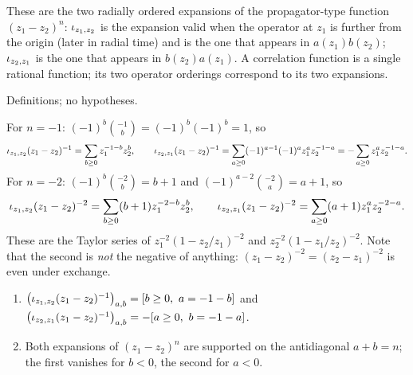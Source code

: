 \begin{physics}
These are the two radially ordered expansions of the propagator-type function $(z_1-z_2)^n$:
$\iota_{z_1,z_2}$ is the expansion valid when the operator at $z_1$ is further from the origin (later in radial time)
and is the one that appears in $a(z_1)b(z_2)$; $\iota_{z_2,z_1}$ is the one that appears in $b(z_2)a(z_1)$. A
correlation function is a single rational function; its two operator orderings correspond to its two
expansions.
\end{physics}

\begin{status}
Definitions; no hypotheses.
\end{status}

\begin{example}\label{l01:ex:poles}
For $n = -1$: $(-1)^b\binom{-1}b = (-1)^b(-1)^b = 1$, so
\begin{equation*}
  \iota_{z_1,z_2}(z_1-z_2)^{-1} = \sum_{b\ge0}z_1^{-1-b}z_2^{b},\qquad
  \iota_{z_2,z_1}(z_1-z_2)^{-1} = \sum_{a\ge0}(-1)^{a-1}(-1)^az_1^az_2^{-1-a} = -\sum_{a\ge0}z_1^az_2^{-1-a}.
\end{equation*}
For $n = -2$: $(-1)^b\binom{-2}b = b+1$ and $(-1)^{a-2}\binom{-2}a = a+1$, so
\begin{equation*}
  \iota_{z_1,z_2}(z_1-z_2)^{-2} = \sum_{b\ge0}(b+1)z_1^{-2-b}z_2^{b},\qquad
  \iota_{z_2,z_1}(z_1-z_2)^{-2} = \sum_{a\ge0}(a+1)z_1^{a}z_2^{-2-a}.
\end{equation*}
These are the Taylor series of $z_1^{-2}(1-z_2/z_1)^{-2}$ and $z_2^{-2}(1-z_1/z_2)^{-2}$. Note that the second is
\emph{not} the negative of anything: $(z_1-z_2)^{-2} = (z_2-z_1)^{-2}$ is even under exchange.
\end{example}

\begin{proposition}\label{l01:prop:expandvals}
\leavevmode
\begin{enumerate}[label=(\alph*)]
\item $\big(\iota_{z_1,z_2}(z_1-z_2)^{-1}\big)_{a,b} = [b\ge0,\ a = -1-b]$ and
  $\big(\iota_{z_2,z_1}(z_1-z_2)^{-1}\big)_{a,b} = -[a\ge0,\ b = -1-a]$.
\item Both expansions of $(z_1-z_2)^n$ are supported on the antidiagonal $a+b = n$; the first vanishes for
  $b<0$, the second for $a<0$.
\end{enumerate}
\end{proposition}

